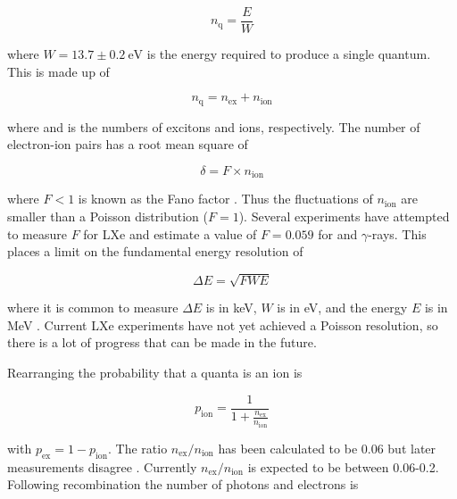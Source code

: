 \begin{equation}
n_{\mathrm{q}} = \frac{E}{W}
\label{eq:nquant_er}
\end{equation}

\noindent where $W = 13.7 \pm 0.2\ \mathrm{eV}$  is the energy required to produce a single quantum.  This is made up
of

\begin{equation}
n_{\mathrm{q}} = n_{\mathrm{ex}} + n_{\mathrm{ion}}
\label{eq:quanta}
\end{equation}

\noindent where \nex and \nion is the numbers of excitons and ions, respectively.  The number of electron-ion pairs has a root mean square
of

\begin{equation}
\delta = F \times n_{\mathrm{ion}}
\label{eq:fano}
\end{equation}

\noindent where $F < 1$ is known as the Fano factor .  Thus the fluctuations of $n_{\mathrm{ion}}$ are smaller than a
Poisson distribution ($F = 1$).  Several experiments have attempted to measure $F$ for LXe  and
estimate a value of $F = 0.059$ for \electron and $\gamma$-rays.  This places a limit on the fundamental energy resolution of

\begin{equation}
\Delta E = \sqrt{F W E}
\end{equation}

\noindent where it is common to measure $\Delta E$ is in keV, $W$ is in eV, and the energy $E$ is in MeV .  Current
LXe experiments have not yet achieved a Poisson resolution, so there is a lot of progress that can be made in the future.

Rearranging  the probability that a quanta is an ion is

\begin{equation}
p_{\mathrm{ion}} = \frac{1}{1 + \frac{ n_{\mathrm{ex}} }{ n_{\mathrm{ion}} }}
\end{equation}

\noindent with $p_{\mathrm{ex}} = 1 - p_{\mathrm{ion}}$.  The ratio $n_{\mathrm{ex}} / n_{\mathrm{ion}}$ has been calculated to be
0.06 
but later measurements disagree .  Currently $n_{\mathrm{ex}} / n_{\mathrm{ion}}$ is expected to be
between 0.06-0.2.  Following recombination the number of photons and electrons is


